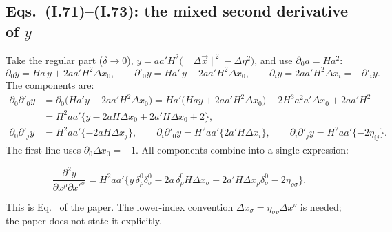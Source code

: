 \subsection[Eqs. (I.71)--(I.73): the mixed second derivative of y]{Eqs.~(I.71)--(I.73): the mixed second derivative of $y$ \tD}

Take the regular part ($\delta\to0$), $y=aa'H^2\big(\|\Delta\vec x\|^2-\Delta\eta^2\big)$, and use $\partial_0a=Ha^2$:
\begin{equation}
\partial_0y=Ha\,y+2aa'H^2\Delta x_0,\qquad \partial'_0y=Ha'\,y-2aa'H^2\Delta x_0,\qquad \partial_iy=2aa'H^2\Delta x_i=-\partial'_iy .
\label{eq:ch05:t11:dy}
\end{equation}
The components are:
\begin{equation*}
\begin{aligned}
\partial_0\partial'_0y&=\partial_0\big(Ha'y-2aa'H^2\Delta x_0\big)=Ha'\big(Hay+2aa'H^2\Delta x_0\big)-2H^3a^2a'\Delta x_0+2aa'H^2\\
&=H^2aa'\big\{y-2aH\Delta x_0+2a'H\Delta x_0+2\big\},\\
\partial_0\partial'_jy&=H^2aa'\{-2aH\Delta x_j\},\qquad \partial_i\partial'_0y=H^2aa'\{2a'H\Delta x_i\},\qquad \partial_i\partial'_jy=H^2aa'\{-2\eta_{ij}\}.
\end{aligned}
\end{equation*}
The first line uses $\partial_0\Delta x_0=-1$. All components combine into a single expression:
\begin{resultbox}
\begin{equation}
\frac{\partial^2y}{\partial x^\rho\partial x'^\sigma}=H^2aa'\big\{y\,\delta^0_\rho\delta^0_\sigma-2a\,\delta^0_\rho H\Delta x_\sigma+2a'H\Delta x_\rho\delta^0_\sigma-2\eta_{\rho\sigma}\big\}.
\tag{I.71}\label{eq:ch05:I71}
\end{equation}
\end{resultbox}
\noindent This is Eq.~ of the paper. The lower-index convention $\Delta x_\sigma=\eta_{\sigma\nu}\Delta x^\nu$ is needed; the paper does not state it explicitly.

